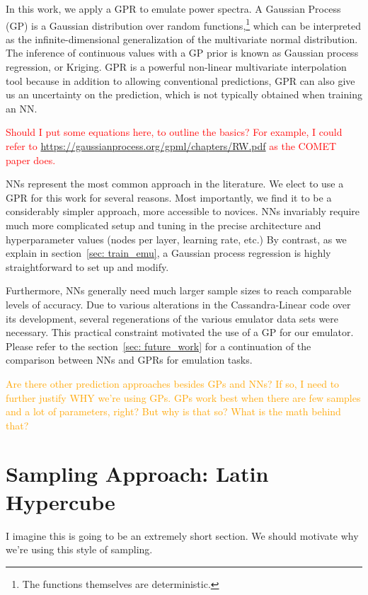 In this work, we apply a GPR to emulate power spectra. A Gaussian Process 
(GP) is a Gaussian distribution over random functions,\footnote{The functions
themselves are deterministic.} which can be interpreted
as the infinite-dimensional generalization of the multivariate normal
distribution. The inference of continuous values with a GP prior
is known as Gaussian process regression, or Kriging. GPR is a
powerful non-linear multivariate interpolation tool because in addition to
allowing conventional predictions, GPR can also give us an uncertainty on the
prediction, which is not typically obtained when training an NN.

\textcolor{red}{Should I put some equations here, to outline the basics?
For example, I could refer to
\url{https://gaussianprocess.org/gpml/chapters/RW.pdf} as the COMET paper
does.}

NNs represent the most common approach in the literature. We elect to use a
GPR for this work for several reasons. Most importantly, we find it to be
a considerably simpler approach, more accessible to novices.
NNs invariably require much more complicated setup and tuning in the precise 
architecture and hyperparameter values (nodes per layer, learning rate, etc.) 
By contrast, as we explain in section~\ref{sec: train_emu}, a Gaussian
process regression is highly straightforward to set up and modify.

Furthermore, NNs generally need much larger sample sizes to reach comparable 
levels of accuracy. Due to various alterations in the Cassandra-Linear code 
over its development, several regenerations of the various emulator data sets 
were necessary. This practical constraint motivated the use of a GP for our
emulator. Please refer to the section~\ref{sec: future_work} for a
continuation of the comparison between NNs and GPRs for emulation tasks.

\textcolor{orange}{Are there other prediction approaches besides GPs and NNs? 
If so, I need to further justify WHY we’re using GPs.
GPs work best when there are few samples and a lot of 
parameters, right? But why is that so? What is the math behind that?}


\section{Sampling Approach: Latin Hypercube}
\label{sec: lhc_theory}

I imagine this is going to be an extremely short section. We should motivate
why we're using this style of sampling.

